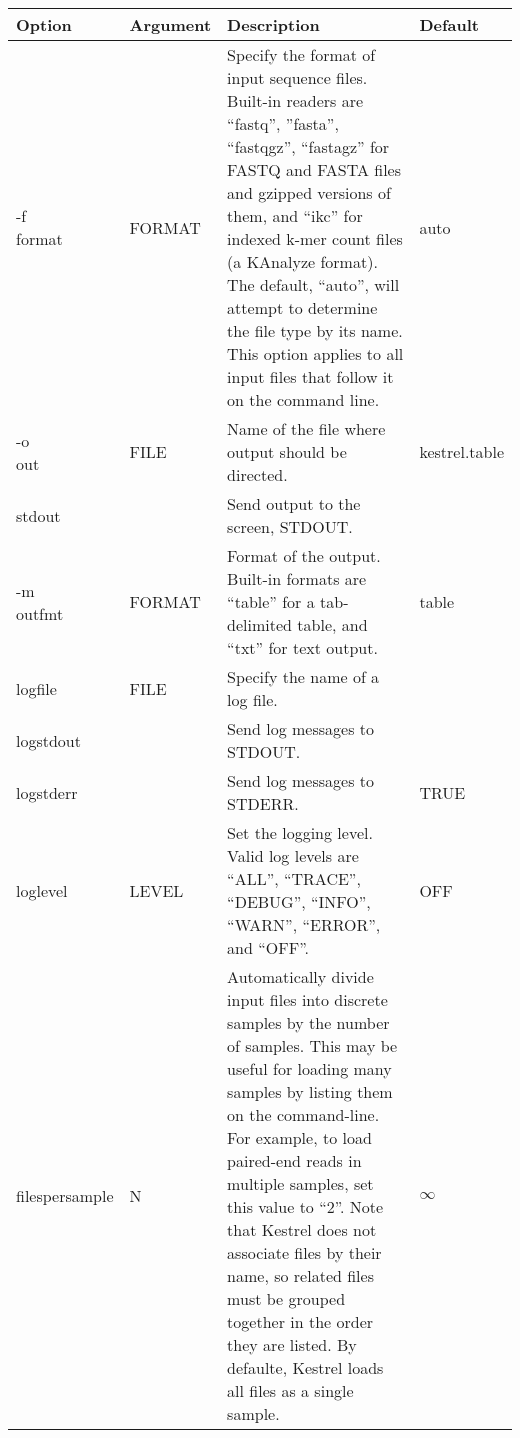 \begin{small}
	\begin{longtable}{|p{\optwidth}|p{\argwidth}|p{\dscwidth}|p{}|}
		\hline
		
		\textbf{Option} & \textbf{Argument} & \textbf{Description} & \textbf{Default} \\ \hline
		
		\optbox{-f\\\ddash{}format} & FORMAT &
		Specify the format of input sequence files. Built-in readers are ``fastq'', ''fasta'', ``fastqgz'', ``fastagz'' for FASTQ and FASTA files and gzipped versions of them, and ``ikc'' for indexed k-mer count files (a KAnalyze format). The default, ``auto'', will attempt to determine the file type by its name. This option applies to all input files that follow it on the command line.
		& auto
		\\ \hline
		
		\optbox{-o\\\ddash{}out} & FILE &
		Name of the file where output should be directed.
		& kestrel.table
		\\ \hline
		
		\ddash{}stdout & &
		Send output to the screen, STDOUT.
		&
		\\ \hline
		
		\optbox{-m\\\ddash{}outfmt} & FORMAT &
		Format of the output. Built-in formats are ``table'' for a tab-delimited table, and ``txt'' for text output.
		& table
		\\ \hline
		
		\ddash{}logfile & FILE &
		Specify the name of a log file.
		&
		\\ \hline
		
		\ddash{}logstdout & &
		Send log messages to STDOUT.
		&
		\\ \hline
		
		\ddash{}logstderr & &
		Send log messages to STDERR.
		& TRUE
		\\ \hline
		
		\ddash{}loglevel & LEVEL &
		Set the logging level. Valid log levels are ``ALL'', ``TRACE'', ``DEBUG'', ``INFO'', ``WARN'', ``ERROR'', and ``OFF''.
		& OFF
		\\ \hline
		
		\ddash{}filespersample & N &
		Automatically divide input files into discrete samples by the number of samples. This may be useful for loading many samples by listing them on the command-line. For example, to load paired-end reads in multiple samples, set this value to ``2''. Note that Kestrel does not associate files by their name, so related files must be grouped together in the order they are listed. By defaulte, Kestrel loads all files as a single sample.
		& $\infty$
		\\ \hline
		

\end{longtable}
\end{small}

